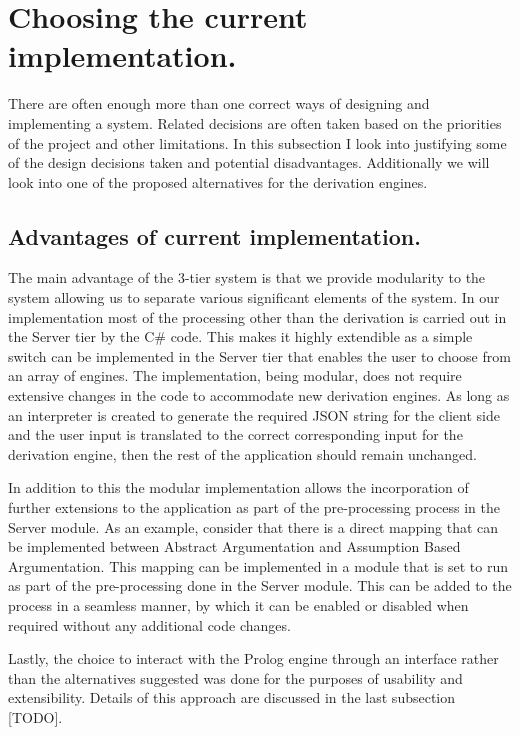 \section{Choosing the current implementation.}

There are often enough more than one correct ways of designing and implementing a system. Related decisions are often taken based on the priorities of the project and other limitations. In this subsection I look into justifying some of the design decisions taken and potential disadvantages. Additionally we will look into one of the proposed alternatives for the derivation engines.

\subsection{Advantages of current implementation.}
The main advantage of the 3-tier system is that we provide modularity to the system allowing us to separate various significant elements of the system. In our implementation most of the processing other than the derivation is carried out in the Server tier by the C\# code. This makes it highly extendible as a simple switch can be implemented in the Server tier that enables the user to choose from an array of engines. The implementation, being modular, does not require extensive changes in the code to accommodate new derivation engines. As long as an interpreter is created to generate the required JSON string for the client side and the user input is translated to the correct corresponding input for the derivation engine, then the rest of the application should remain unchanged.

In addition to this the modular implementation allows the incorporation of further extensions to the application as part of the pre-processing process in the Server module. As an example, consider that there is a direct mapping that can be implemented between Abstract Argumentation and Assumption Based Argumentation. This mapping can be implemented in a module that is set to run as part of the pre-processing done in the Server module. This can be added to the process in a seamless manner, by which it can be enabled or disabled when required without any additional code changes.

Lastly, the choice to interact with the Prolog engine through an interface rather than the alternatives suggested was done for the purposes of usability and extensibility. Details of this approach are discussed in the last subsection [TODO]. 

